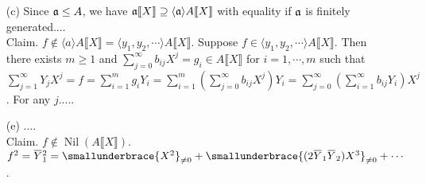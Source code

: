 \begin{example}
    \begin{enumerate}
        \item [(c)] Since $\mathfrak{a} \leq A$, we have $\mathfrak{a} \llbracket X \rrbracket \supseteq \langle \mathfrak{a} \rangle A \llbracket X \rrbracket$ with equality if $\mathfrak{a}$ is finitely generated.... \\
            Claim.  $f \not \in \langle a \rangle A\llbracket X \rrbracket = \langle y_1,y_2,\cdots \rangle A\llbracket X \rrbracket$. Suppose $f \in \langle y_1,y_2,\cdots \rangle A\llbracket X \rrbracket$. Then there exists $m \geq 1$ and $\sum_{j=0}^\infty b_{ij}X^j = g_i \in A\llbracket X \rrbracket$ for $i = 1,\cdots,m$ such that $\sum_{j=1}^\infty Y_jX^j = f = \sum_{i=1}^m g_iY_i = \sum_{i=1}^m (\sum_{j=0}^\infty b_{ij}X^j)Y_i = \sum_{j=0}^\infty (\sum_{i=1}^\infty b_{ij}Y_i)X^j$. For any $j$.....
        \item [(e)]
            ....\\
            Claim. $f \not \in \operatorname{Nil}(A\llbracket X \rrbracket)$. $f^2 = \overbar Y_1^2 = \smallunderbrace{X^2}_{\neq 0} + \smallunderbrace{(2\overbar Y_1 \overbar Y_2)X^3}_{\neq 0} + \cdots$.
    \end{enumerate}
\end{example}












